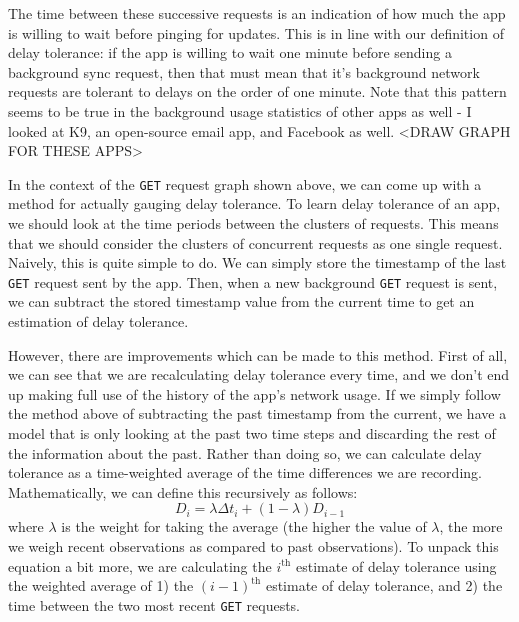 \documentclass[12pt, fleqn]{article}
\begin{document}
The time between these successive requests is an indication of how much the app 
is willing to wait before pinging for updates. This is in line with our 
definition of delay tolerance: if the app is willing to wait one minute before 
sending a background sync request, then that must mean that it's background 
network requests are tolerant to delays on the order of one minute. 
Note that this pattern seems to be true in the background usage 
statistics of other apps as well - I looked at K9, an open-source email app, and 
Facebook as well. <DRAW GRAPH FOR THESE APPS>

In the context of the \texttt{GET} request graph shown above, we can come up
with a method for actually gauging delay tolerance. To learn delay tolerance of an app, we should 
look at the time periods between the clusters of requests. This means that we should
consider the clusters of concurrent requests as one single request. Naively, 
this is quite simple to do. We can simply store the timestamp of the last \texttt{GET} 
request sent by the app. Then, when a new background \texttt{GET} request is sent, 
we can subtract the stored timestamp value from the current time to get an
estimation of delay tolerance. 

However, there are improvements which can be made to this method. First of all, 
we can see that we are recalculating delay tolerance every time, and we don't 
end up making full use of the history of the app's network usage. If we simply 
follow the method above of subtracting the past timestamp from the current, we 
have a model that is only looking at the past two time steps and discarding
the rest of the information about the past. Rather than doing 
so, we can calculate delay tolerance as a time-weighted average of the time 
differences we are recording. Mathematically, we can define this recursively as 
follows:
\begin{equation} \label{eq-dt-weighted-avg}
  D_i = \lambda \Delta t_i + (1 - \lambda) D_{i-1}
\end{equation}
where $\lambda$ is the weight for taking the average (the higher the value of 
$\lambda$, the more we weigh recent observations as compared to past 
observations). To unpack this equation a bit more, we are calculating the $i^\textrm{th}$ 
estimate of delay tolerance using the weighted average of 1) the $(i - 1)^\textrm{th}$ 
estimate of delay tolerance, and 2) the time between the two most recent \texttt{GET} requests.
\end{document}
